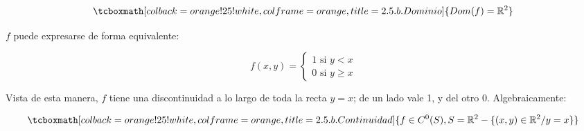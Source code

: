 \documentclass{article}
\renewcommand{\Bbb}{\mathbb}
\begin{document}
\begin{equation}
\tcboxmath[colback=orange!25!white,colframe=orange,title=2.5.b. Dominio ]
{ \mathop{Dom}(f) = \Bbb R^2 }
\end{equation}

$f$ puede expresarse de forma equivalente:

\begin{equation}
f(x,y) = \left\{ \begin{array}{ll}
1 \text{ si } y < x \\
0 \text{ si } y \geq x
\end{array} \right.
\end{equation}

Vista de esta manera, $f$ tiene una discontinuidad a lo largo de toda la recta $y = x$; de un lado vale 1, y del otro 0. Algebraicamente:

\begin{equation}
\tcboxmath[colback=orange!25!white,colframe=orange,title=2.5.b. Continuidad ]
{ f \in C^0(S), S = \Bbb R^2 - \{ (x,y) \in \Bbb R^2 / y = x \} }
\end{equation}
\end{document}
